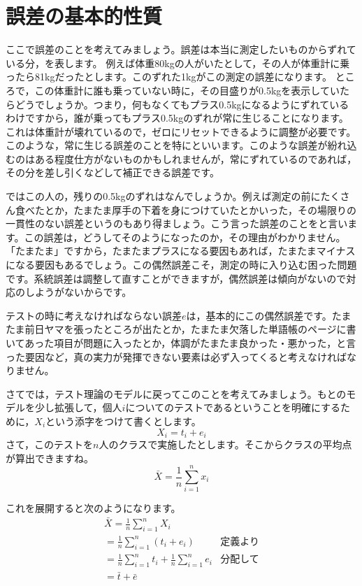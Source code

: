 \documentclass{ltjbook}
\begin{document}
\section{誤差の基本的性質}
ここで誤差のことを考えてみましょう。誤差は本当に測定したいものからずれている分，を表します。
例えば体重80kgの人がいたとして，その人が体重計に乗ったら81kgだったとします。このずれた1kgがこの測定の誤差になります。
ところで，この体重計に誰も乗っていない時に，その目盛りが0.5kgを表示していたらどうでしょうか。つまり，何もなくてもプラス0.5kgになるようにずれているわけですから，誰が乗ってもプラス0.5kgのずれが常に生じることになります。これは体重計が壊れているので，ゼロにリセットできるように調整が必要です。このような，常に生じる誤差のことを特にといいます。このような誤差が紛れ込むのはある程度仕方がないものかもしれませんが，常にずれているのであれば，その分を差し引くなどして補正できる誤差です。

ではこの人の，残りの0.5kgのずれはなんでしょうか。例えば測定の前にたくさん食べたとか，たまたま厚手の下着を身につけていたとかいった，その場限りの一貫性のない誤差というのもあり得ましょう。こう言った誤差のことをと言います。この誤差は，どうしてそのようになったのか，その理由がわかりません。「たまたま」ですから，たまたまプラスになる要因もあれば，たまたまマイナスになる要因もあるでしょう。この偶然誤差こそ，測定の時に入り込む困った問題です。系統誤差は調整して直すことができますが，偶然誤差は傾向がないので対応のしようがないからです。

テストの時に考えなければならない誤差$e$は，基本的にこの偶然誤差です。たまたま前日ヤマを張ったところが出たとか，たまたま欠落した単語帳のページに書いてあった項目が問題に入ったとか，体調がたまたま良かった・悪かった，と言った要因など，真の実力が発揮できない要素は必ず入ってくると考えなければなりません。

さてでは，テスト理論のモデルに戻ってこのことを考えてみましょう。もとのモデルを少し拡張して，個人$i$についてのテストであるということを明確にするために，$X_i$という添字をつけて書くとします。
\[ X_i = t_i + e_i \]
さて，このテストを$n$人のクラスで実施したとします。そこからクラスの平均点が算出できますね。
\[ \bar{X} = \frac{1}{n}\sum_{i=1}^n x_i \]

これを展開すると次のようになります。
\begin{align*}
    &       \bar{X}  =  \frac{1}{n}\sum_{i=1}^n X_i  & &\mbox{}\\
    &                    =  \frac{1}{n}\sum_{i=1}^n (t_i + e_i) &\mbox{定義より}\\
    &                     =  \frac{1}{n} \sum_{i=1}^n  t_i + \frac{1}{n}\sum_{i=1}^n  e_i &\mbox{分配して}\\
    &                     =  \bar{t} + \bar{e} &\mbox{}\\
\end{align*}
\end{document}
